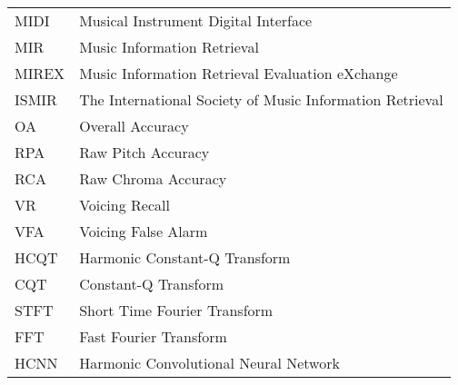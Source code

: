 \documentclass[12pt,a4paper,twoside,openright]{report}
\begin{document}



\tableofcontents











\listoffigures

\listoftables


\begin{tabular}{ll}
MIDI & Musical Instrument Digital Interface \\
MIR & Music Information Retrieval \\
MIREX & Music Information Retrieval Evaluation eXchange \\
ISMIR & The International Society of Music Information Retrieval \\
OA & Overall Accuracy \\
RPA & Raw Pitch Accuracy \\
RCA & Raw Chroma Accuracy \\
VR & Voicing Recall \\
VFA & Voicing False Alarm \\
HCQT & Harmonic Constant-Q Transform \\
CQT & Constant-Q Transform \\
STFT & Short Time Fourier Transform \\
FFT & Fast Fourier Transform \\
HCNN & Harmonic Convolutional Neural Network \\
\end{tabular}

\end{document}
